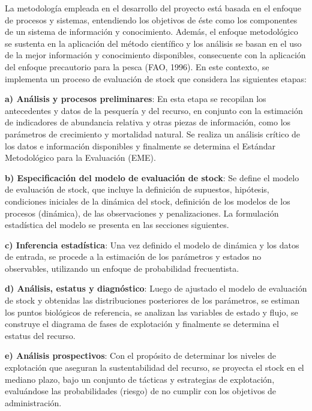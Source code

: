 \documentclass[
  spanish,
]{article}
\begin{document}
La metodología empleada en el desarrollo del proyecto está basada en el
enfoque de procesos y sistemas, entendiendo los objetivos de éste como
los componentes de un sistema de información y conocimiento. Además, el
enfoque metodológico se sustenta en la aplicación del método científico
y los análisis se basan en el uso de la mejor información y conocimiento
disponibles, consecuente con la aplicación del enfoque precautorio para
la pesca (FAO, 1996). En este contexto, se implementa un proceso de
evaluación de stock que considera las siguientes etapas:

\vspace{0.5cm}

\textbf{a) Análisis y procesos preliminares}: En esta etapa se recopilan
los antecedentes y datos de la pesquería y del recurso, en conjunto con
la estimación de indicadores de abundancia relativa y otras piezas de
información, como los parámetros de crecimiento y mortalidad natural. Se
realiza un análisis crítico de los datos e información disponibles y
finalmente se determina el Estándar Metodológico para la Evaluación
(EME).

\textbf{b) Especificación del modelo de evaluación de stock}: Se define
el modelo de evaluación de stock, que incluye la definición de
supuestos, hipótesis, condiciones iniciales de la dinámica del stock,
definición de los modelos de los procesos (dinámica), de las
observaciones y penalizaciones. La formulación estadística del modelo se
presenta en las secciones siguientes.

\textbf{c) Inferencia estadística}: Una vez definido el modelo de
dinámica y los datos de entrada, se procede a la estimación de los
parámetros y estados no observables, utilizando un enfoque de
probabilidad frecuentista.

\textbf{d) Análisis, estatus y diagnóstico}: Luego de ajustado el modelo
de evaluación de stock y obtenidas las distribuciones posteriores de los
parámetros, se estiman los puntos biológicos de referencia, se analizan
las variables de estado y flujo, se construye el diagrama de fases de
explotación y finalmente se determina el estatus del recurso.

\textbf{e) Análisis prospectivos}: Con el propósito de determinar los
niveles de explotación que aseguran la sustentabilidad del recurso, se
proyecta el stock en el mediano plazo, bajo un conjunto de tácticas y
estrategias de explotación, evaluándose las probabilidades (riesgo) de
no cumplir con los objetivos de administración.
\end{document}

